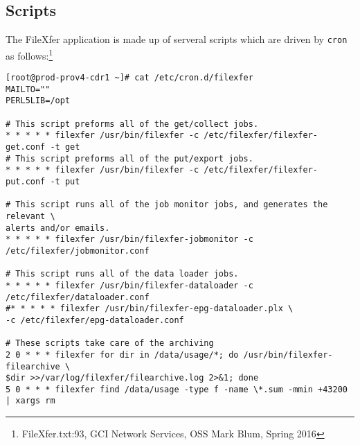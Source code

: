 
\newpage
\subsection{Scripts}
The FileXfer application is made up of serveral scripts which are driven
by \texttt{cron} as follows:\footnote{FileXfer.txt:93, GCI Network Services,
OSS Mark Blum, Spring 2016}

\begin{verbatim}
[root@prod-prov4-cdr1 ~]# cat /etc/cron.d/filexfer
MAILTO=""
PERL5LIB=/opt

# This script preforms all of the get/collect jobs.
* * * * * filexfer /usr/bin/filexfer -c /etc/filexfer/filexfer-get.conf -t get
# This script preforms all of the put/export jobs.
* * * * * filexfer /usr/bin/filexfer -c /etc/filexfer/filexfer-put.conf -t put

# This script runs all of the job monitor jobs, and generates the relevant \
alerts and/or emails.
* * * * * filexfer /usr/bin/filexfer-jobmonitor -c /etc/filexfer/jobmonitor.conf

# This script runs all of the data loader jobs.
* * * * * filexfer /usr/bin/filexfer-dataloader -c /etc/filexfer/dataloader.conf
#* * * * * filexfer /usr/bin/filexfer-epg-dataloader.plx \
-c /etc/filexfer/epg-dataloader.conf

# These scripts take care of the archiving
2 0 * * * filexfer for dir in /data/usage/*; do /usr/bin/filexfer-filearchive \
$dir >>/var/log/filexfer/filearchive.log 2>&1; done
5 0 * * * filexfer find /data/usage -type f -name \*.sum -mmin +43200 | xargs rm
\end{verbatim}

